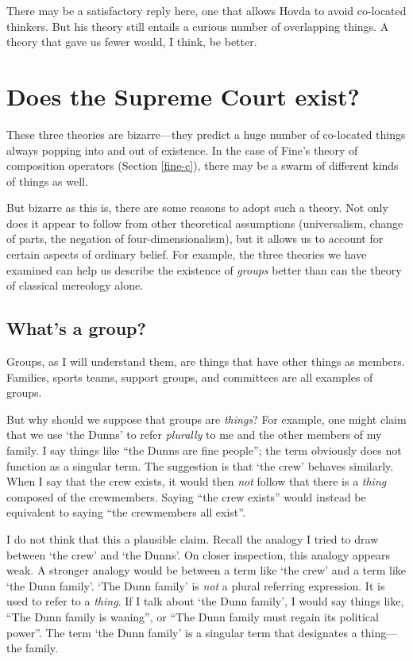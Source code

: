 \documentclass[11pt]{article}
\begin{document}
\begin{spacing}{1.5}
There may be a satisfactory reply here, one that allows Hovda to avoid
co-located thinkers.  But his theory still entails a curious number of
overlapping things.  A theory that gave us fewer would, I think, be
better.

\section{Does the Supreme Court exist?}
\label{groups}
These three theories are bizarre---they predict a huge number of
co-located things always popping into and out of existence.  In the
case of Fine's theory of composition operators (Section \ref{fine-c}),
there may be a swarm of different kinds of things as well.  

But bizarre as this is, there are some reasons to adopt such a theory.
Not only does it appear to follow from other theoretical assumptions
(universalism, change of parts, the negation of four-dimensionalism),
but it allows us to account for certain aspects of ordinary belief.
For example, the three theories we have examined can help us describe
the existence of {\em groups} better than can the theory of classical
mereology alone.

\subsection{What's a group?}
\label{what-g}
Groups, as I will understand them, are things that have other things
as members.  Families, sports teams, support groups, and committees
are all examples of groups.

But why should we suppose that groups are {\em things}?  For example,
one might claim that we use `the Dunns' to refer {\em plurally} to me
and the other members of my family.  I say things like ``the Dunns are
fine people''; the term obviously does not function as a singular
term.  The suggestion is that `the crew' behaves similarly.  When I
say that the crew exists, it would then {\em not} follow that there is
a {\em thing} composed of the crewmembers.  Saying ``the crew exists''
would instead be equivalent to saying ``the crewmembers all exist''.

I do not think that this a plausible claim.  Recall the analogy I
tried to draw between `the crew' and `the Dunns'.  On closer
inspection, this analogy appears weak.  A stronger analogy would be
between a term like `the crew' and a term like `the Dunn family'.
`The Dunn family' is {\em not} a plural referring expression.  It is
used to refer to a {\em thing}.  If I talk about `the Dunn family', I
would say things like, ``The Dunn family is waning'', or ``The Dunn
family must regain its political power''.  The term `the Dunn family'
is a singular term that designates a thing---the family.


\end{spacing}
\end{document}

